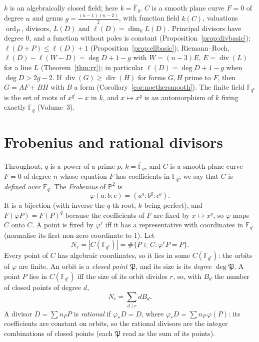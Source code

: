\begin{reminder}
$k$ is an algebraically closed field; here $k=\overline{\mathbb F}_q$. $C$ is a smooth plane curve $F=0$ of degree $n$ and genus $g=\frac{(n-1)(n-2)}2$, with function
field $k(C)$, valuations $\operatorname{ord}_P$, divisors, $L(D)$ and $\ell(D)=\dim_kL(D)$. Principal divisors have degree $0$, and a function without poles is
constant (Proposition~\ref{prop:divbasic}); $\ell(D+P)\le\ell(D)+1$ (Proposition~\ref{prop:ellbasic}); Riemann--Roch, $\ell(D)-\ell(W-D)=\deg D+1-g$ with
$W=(n-3)E$, $E=\operatorname{div}(L)$ for a line $L$ (Theorem~\ref{thm:rr}); in particular $\ell(D)=\deg D+1-g$ when $\deg D>2g-2$. If $\operatorname{div}(G)\ge\operatorname{div}(H)$
for forms $G,H$ prime to $F$, then $G=AF+BH$ with $B$ a form (Corollary~\ref{cor:noethersmooth}). The finite field $\mathbb F_{q^r}$ is the set of roots of
$x^{q^r}-x$ in $k$, and $x\mapsto x^q$ is an automorphism of $k$ fixing exactly $\mathbb F_q$ (Volume~3).
\end{reminder}

\section{Frobenius and rational divisors}

Throughout, $q$ is a power of a prime $p$, $k=\overline{\mathbb F}_q$, and $C$ is a smooth plane curve $F=0$ of degree $n$ whose equation $F$ has coefficients in
$\mathbb F_q$; we say that $C$ is \emph{defined over $\mathbb F_q$}. The \emph{Frobenius} of $\mathbb P^2$ is
\[
\varphi(a:b:c)=(a^q:b^q:c^q).
\]
It is a bijection (with inverse the $q$-th root, $k$ being perfect), and $F(\varphi P)=F(P)^q$ because the coefficients of $F$ are fixed by $x\mapsto x^q$, so
$\varphi$ maps $C$ onto $C$. A point is fixed by $\varphi^r$ iff it has a representative with coordinates in $\mathbb F_{q^r}$ (normalise its first non-zero
coordinate to $1$). Let
\[
N_r=|C(\mathbb F_{q^r})|=\#\{P\in C:\varphi^rP=P\}.
\]
Every point of $C$ has algebraic coordinates, so it lies in some $C(\mathbb F_{q^r})$: the orbits of $\varphi$ are finite. An orbit is a \emph{closed point} $\mathfrak P$,
and its size is its \emph{degree} $\deg\mathfrak P$. A point $P$ lies in $C(\mathbb F_{q^r})$ iff the size of its orbit divides $r$, so, with $B_d$ the number of closed
points of degree $d$,
\begin{equation}\label{eq:NrBd}
N_r=\sum_{d\mid r}dB_d.
\end{equation}
A divisor $D=\sum n_PP$ is \emph{rational} if $\varphi_*D=D$, where $\varphi_*D=\sum n_P\,\varphi(P)$: its coefficients are constant on orbits, so the rational
divisors are the integer combinations of closed points (each $\mathfrak P$ read as the sum of its points).

